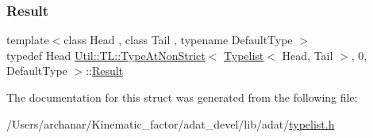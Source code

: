 \mbox{\label{structUtil_1_1TL_1_1TypeAtNonStrict_3_01Typelist_3_01Head_00_01Tail_01_4_00_010_00_01DefaultType_01_4_a436fb34f639a42264d429c417d21785a}} 
\subsubsection{\texorpdfstring{Result}{Result}\hspace{0.1cm}{\footnotesize\ttfamily [2/2]}}
{\footnotesize\ttfamily template$<$class Head , class Tail , typename Default\+Type $>$ \\
typedef Head \mbox{\hyperlink{structUtil_1_1TL_1_1TypeAtNonStrict}{Util\+::\+T\+L\+::\+Type\+At\+Non\+Strict}}$<$ \mbox{\hyperlink{structUtil_1_1Typelist}{Typelist}}$<$ Head, Tail $>$, 0, Default\+Type $>$\+::\mbox{\hyperlink{structUtil_1_1TL_1_1TypeAtNonStrict_3_01Typelist_3_01Head_00_01Tail_01_4_00_010_00_01DefaultType_01_4_a436fb34f639a42264d429c417d21785a}{Result}}}



The documentation for this struct was generated from the following file\+:\begin{DoxyCompactItemize}
\item 
/\+Users/archanar/\+Kinematic\+\_\+factor/adat\+\_\+devel/lib/adat/\mbox{\hyperlink{lib_2adat_2typelist_8h}{typelist.\+h}}\end{DoxyCompactItemize}
